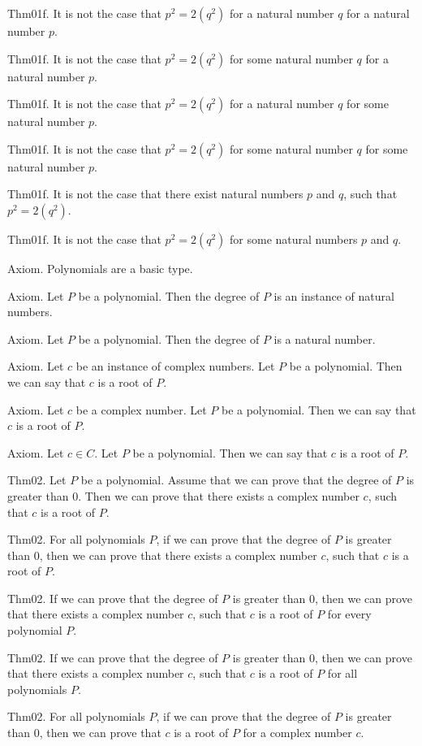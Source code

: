 \documentclass{article}
\begin{document}
Thm01f. It is not the case that $p ^{ 2}= 2 (q ^{ 2})$ for a natural number $q$ for a natural number $p$.

Thm01f. It is not the case that $p ^{ 2}= 2 (q ^{ 2})$ for some natural number $q$ for a natural number $p$.

Thm01f. It is not the case that $p ^{ 2}= 2 (q ^{ 2})$ for a natural number $q$ for some natural number $p$.

Thm01f. It is not the case that $p ^{ 2}= 2 (q ^{ 2})$ for some natural number $q$ for some natural number $p$.

Thm01f. It is not the case that there exist natural numbers $p$ and $q$, such that $p ^{ 2}= 2 (q ^{ 2})$.

Thm01f. It is not the case that $p ^{ 2}= 2 (q ^{ 2})$ for some natural numbers $p$ and $q$.

Axiom. Polynomials are a basic type.

Axiom. Let $P$ be a polynomial. Then the degree of $P$ is an instance of natural numbers.

Axiom. Let $P$ be a polynomial. Then the degree of $P$ is a natural number.

Axiom. Let $c$ be an instance of complex numbers. Let $P$ be a polynomial. Then we can say that $c$ is a root of $P$.

Axiom. Let $c$ be a complex number. Let $P$ be a polynomial. Then we can say that $c$ is a root of $P$.

Axiom. Let $c \in C$. Let $P$ be a polynomial. Then we can say that $c$ is a root of $P$.

Thm02. Let $P$ be a polynomial. Assume that we can prove that the degree of $P$ is greater than $0$. Then we can prove that there exists a complex number $c$, such that $c$ is a root of $P$.

Thm02. For all polynomials $P$, if we can prove that the degree of $P$ is greater than $0$, then we can prove that there exists a complex number $c$, such that $c$ is a root of $P$.

Thm02. If we can prove that the degree of $P$ is greater than $0$, then we can prove that there exists a complex number $c$, such that $c$ is a root of $P$ for every polynomial $P$.

Thm02. If we can prove that the degree of $P$ is greater than $0$, then we can prove that there exists a complex number $c$, such that $c$ is a root of $P$ for all polynomials $P$.

Thm02. For all polynomials $P$, if we can prove that the degree of $P$ is greater than $0$, then we can prove that $c$ is a root of $P$ for a complex number $c$.
\end{document}
